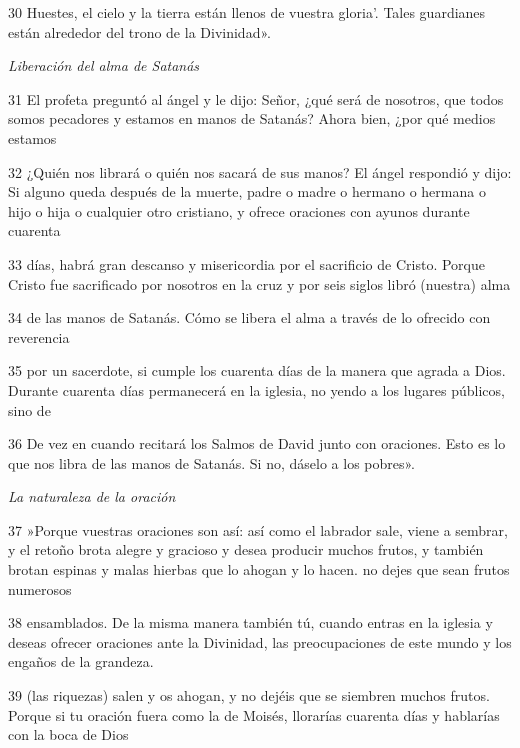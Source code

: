\par 30 Huestes, el cielo y la tierra están llenos de vuestra gloria'. Tales guardianes están alrededor del trono de la Divinidad».

\par \textit{Liberación del alma de Satanás}

\par 31 El profeta preguntó al ángel y le dijo: Señor, ¿qué será de nosotros, que todos somos pecadores y estamos en manos de Satanás? Ahora bien, ¿por qué medios estamos

\par 32 ¿Quién nos librará o quién nos sacará de sus manos? El ángel respondió y dijo: Si alguno queda después de la muerte, padre o madre o hermano o hermana o hijo o hija o cualquier otro cristiano, y ofrece oraciones con ayunos durante cuarenta

\par 33 días, habrá gran descanso y misericordia por el sacrificio de Cristo. Porque Cristo fue sacrificado por nosotros en la cruz y por seis siglos libró (nuestra) alma

\par 34 de las manos de Satanás. Cómo se libera el alma a través de lo ofrecido con reverencia

\par 35 por un sacerdote, si cumple los cuarenta días de la manera que agrada a Dios. Durante cuarenta días permanecerá en la iglesia, no yendo a los lugares públicos, sino de

\par 36 De vez en cuando recitará los Salmos de David junto con oraciones. Esto es lo que nos libra de las manos de Satanás. Si no, dáselo a los pobres».

\par \textit{La naturaleza de la oración}

\par 37 »Porque vuestras oraciones son así: así como el labrador sale, viene a sembrar, y el retoño brota alegre y gracioso y desea producir muchos frutos, y también brotan espinas y malas hierbas que lo ahogan y lo hacen. no dejes que sean frutos numerosos

\par 38 ensamblados. De la misma manera también tú, cuando entras en la iglesia y deseas ofrecer oraciones ante la Divinidad, las preocupaciones de este mundo y los engaños de la grandeza.

\par 39 (las riquezas) salen y os ahogan, y no dejéis que se siembren muchos frutos. Porque si tu oración fuera como la de Moisés, llorarías cuarenta días y hablarías con la boca de Dios


